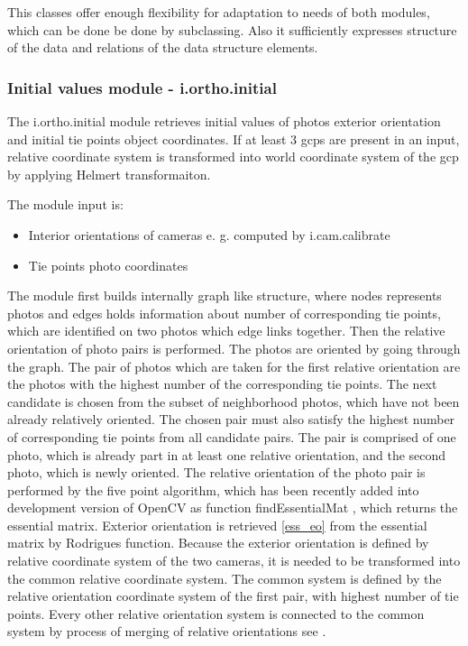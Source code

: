 \documentclass[a4paper,12pt]{article}
\begin{document}
This classes offer enough flexibility for adaptation to needs of both modules, which can be done be done by subclassing. 
Also it sufficiently expresses  structure of the data and relations of the data structure elements.

\subsubsection{Initial values module - i.ortho.initial}

The i.ortho.initial module retrieves initial values of photos exterior orientation and initial tie points object coordinates. If at least 3 gcps are 
present in an input, relative coordinate system is transformed into world coordinate system of the gcp by applying Helmert transformaiton. 

The module input is: 
\begin{itemize}
\item Interior orientations of cameras e. g. computed by i.cam.calibrate
\item Tie points photo coordinates 
\end{itemize}

The module first builds internally graph like structure, where nodes represents photos and edges holds information 
about number of corresponding tie points, which are identified on two photos which edge links together.
Then the relative orientation of photo pairs is performed. The photos are oriented by going through the graph. 
The pair of photos which are taken for the first relative orientation are the photos with the highest number of the corresponding tie points. 
The next candidate is chosen from the subset of neighborhood photos, which have not been already relatively oriented. The chosen pair 
must also satisfy the highest number of corresponding tie points from all candidate pairs. The pair is comprised of one photo, which is already 
part in at least one relative orientation, and the second photo, which is newly oriented. The relative orientation of the photo 
pair is performed by  the five point algorithm, which has been recently added into development version of OpenCV as function findEssentialMat \cite{calib_manual2013opencv},
which returns the essential matrix. Exterior orientation is retrieved \ref{ess_eo} from the essential matrix by Rodrigues \cite{calib_manual2013opencv} 
function. Because the exterior orientation is defined by relative coordinate system of the two cameras, it is needed to be transformed into 
the common relative coordinate system. The common system is defined by the relative orientation coordinate system of the first pair, with highest 
number of tie points.
Every other relative orientation system is connected to the common system by process of merging of relative orientations see \label{sec:ess_chain}.
\end{document}
